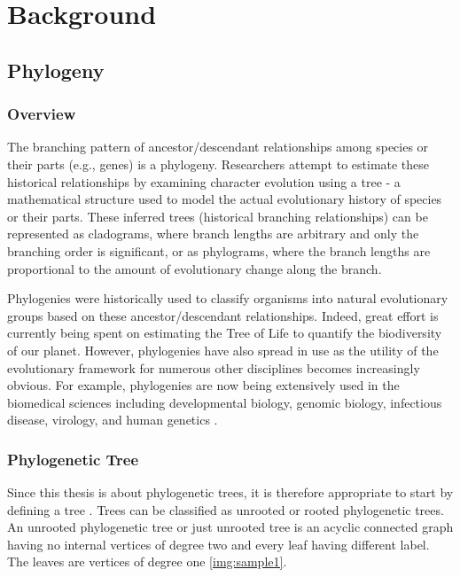 \chapter{Background}

\newtheorem{defi}{Definition} %

\section{Phylogeny}
\subsection{Overview}

The branching pattern of ancestor/descendant relationships among species or
their parts (e.g., genes) is a phylogeny. Researchers attempt to estimate these 
historical relationships by examining character evolution using a tree - a mathematical
structure used to model the actual evolutionary history of species or their parts.
These inferred trees (historical branching relationships) can be represented as 
cladograms, where branch lengths are arbitrary and only the branching order is significant,
or as phylograms, where the branch lengths are proportional to the amount of evolutionary 
change along the branch.

Phylogenies were historically used to classify organisms into natural evolutionary
groups based on these ancestor/descendant relationships. Indeed, great effort is
currently being spent on estimating the Tree of Life to quantify the biodiversity of
our planet. However, phylogenies have also spread in use as the utility of the
evolutionary framework for numerous other disciplines becomes increasingly obvious. 
For example, phylogenies are now being extensively used in the biomedical sciences 
including developmental biology, genomic biology, infectious disease, virology,
and human genetics \cite{jumpstarting}.

\subsection{Phylogenetic Tree}
Since this thesis is about phylogenetic trees, it is therefore 
appropriate to start by defining a tree \cite{alkim}. 
Trees can be classified as unrooted or rooted phylogenetic trees. An 
unrooted phylogenetic tree or just unrooted tree is an acyclic connected 
graph having no internal vertices of degree two and every leaf having 
different label. The leaves are vertices of degree one \ref{img:sample1}.

